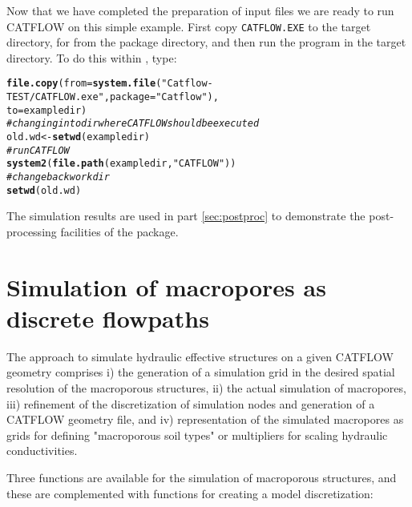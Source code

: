 \documentclass[article,nojss]{jss}\usepackage[]{graphicx}\usepackage[]{xcolor}
\makeatletter
\newcommand{\hlsng}[1]{\textcolor[rgb]{0.192,0.494,0.8}{#1}}%
\newcommand{\hlcom}[1]{\textcolor[rgb]{0.678,0.584,0.686}{\textit{#1}}}%
\newcommand{\hldef}[1]{\textcolor[rgb]{0.345,0.345,0.345}{#1}}%
\newcommand{\hlkwb}[1]{\textcolor[rgb]{0.69,0.353,0.396}{#1}}%
\newcommand{\hlkwc}[1]{\textcolor[rgb]{0.333,0.667,0.333}{#1}}%
\newcommand{\hlkwd}[1]{\textcolor[rgb]{0.737,0.353,0.396}{\textbf{#1}}}%
\newenvironment{kframe}{%
 \def\at@end@of@kframe{}%
 \ifinner\ifhmode%
  \def\at@end@of@kframe{\end{minipage}}%
  \begin{minipage}{\columnwidth}%
 \fi\fi%
 \def\FrameCommand##1{\hskip\@totalleftmargin \hskip-\fboxsep
 \colorbox{shadecolor}{##1}\hskip-\fboxsep
     \hskip-\linewidth \hskip-\@totalleftmargin \hskip\columnwidth}%
 \MakeFramed {\advance\hsize-\width
   \@totalleftmargin\z@ \linewidth\hsize
   \@setminipage}}%
 {\par\unskip\endMakeFramed%
 \at@end@of@kframe}
\newenvironment{knitrout}{}{} %
\makeatother
\begin{document}
Now that we have completed the preparation of input files we are ready to run CATFLOW
on this simple example. First copy \verb+CATFLOW.EXE+ to the target directory, for from the  package directory, and
then run the program in the target directory. To do this within , type:
\begin{knitrout}
\color{fgcolor}\begin{kframe}
\begin{alltt}
\hlkwd{file.copy}\hldef{(}\hlkwc{from} \hldef{=} \hlkwd{system.file}\hldef{(}\hlsng{"Catflow-TEST/CATFLOW.exe"}\hldef{,} \hlkwc{package} \hldef{=} \hlsng{"Catflow"}\hldef{),}
           \hlkwc{to} \hldef{= exampledir)}
\hlcom{# changing into dir where CATFLOW should be executed}
\hldef{old.wd} \hlkwb{<-} \hlkwd{setwd}\hldef{(exampledir)}
\hlcom{# run CATFLOW}
\hlkwd{system2}\hldef{(}\hlkwd{file.path}\hldef{(exampledir,} \hlsng{"CATFLOW"}\hldef{) )}
\hlcom{# change back work dir}
\hlkwd{setwd}\hldef{(old.wd )}
\end{alltt}
\end{kframe}
\end{knitrout}

The simulation results are used in part \ref{sec:postproc} to demonstrate the post-processing facilities of the  package.





\newpage
\part{Simulation of macropores as discrete flowpaths}\label{sec:macro}

The approach to simulate hydraulic effective structures on a given CATFLOW geometry comprises 
i) the generation of a simulation grid in the desired spatial resolution of the macroporous
structures, ii) the actual simulation of macropores, iii) refinement of the discretization of 
simulation nodes and generation of a CATFLOW geometry file, and iv) representation of the 
simulated macropores as grids for defining "macroporous soil types" or multipliers for 
scaling hydraulic conductivities.  

Three functions are available for the simulation of macroporous structures, and these  are 
complemented with functions for creating a model discretization:
 
\end{document}

